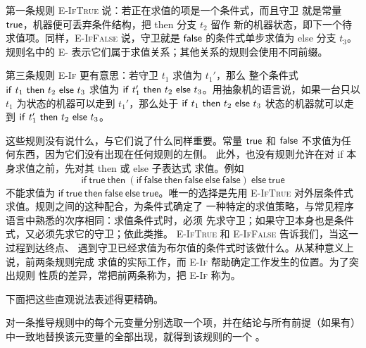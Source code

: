 第一条规则 \textsc{E-IfTrue} 说：若正在求值的项是一个条件式，而且守卫
就是常量 \(\mathsf{true}\)，机器便可丢弃条件结构，把 then 分支 \(t_2\) 留作
新的机器状态，即下一个待求值项。同样，\textsc{E-IfFalse} 说，守卫就是
\(\mathsf{false}\) 的条件式单步求值为 else 分支 \(t_3\)。规则名中的
\textsc{E-} 表示它们属于求值关系；其他关系的规则会使用不同前缀。

第三条规则 \textsc{E-If} 更有意思：若守卫 \(t_1\) 求值为 \(t_1'\)，那么
整个条件式 \(\mathsf{if}\ t_1\ \mathsf{then}\ t_2\ \mathsf{else}\ t_3\) 求值为
\(\mathsf{if}\ t_1'\ \mathsf{then}\ t_2\ \mathsf{else}\ t_3\)。用抽象机的语言说，如果一台只以 \(t_1\)
为状态的机器可以走到 \(t_1'\)，那么处于
\(\mathsf{if}\ t_1\ \mathsf{then}\ t_2\ \mathsf{else}\ t_3\) 状态的机器就可以走到
\(\mathsf{if}\ t_1'\ \mathsf{then}\ t_2\ \mathsf{else}\ t_3\)。

这些规则没有说什么，与它们说了什么同样重要。常量 \(\mathsf{true}\) 和
\(\mathsf{false}\) 不求值为任何东西，因为它们没有出现在任何规则的左侧。
此外，也没有规则允许在对 if 本身求值之前，先对其 then 或 else 子表达式
求值。例如
\[
 \mathsf{if\ true\ then\ (if\ false\ then\ false\ else\ false)\
 else\ true}
\]
不能求值为
\(\mathsf{if\ true\ then\ false\ else\ true}\)。唯一的选择是先用
\textsc{E-IfTrue} 对外层条件式求值。规则之间的这种配合，为条件式确定了
一种特定的求值策略，与常见程序语言中熟悉的次序相同：求值条件式时，必须
先求守卫；如果守卫本身也是条件式，又必须先求它的守卫；依此类推。
\textsc{E-IfTrue} 和 \textsc{E-IfFalse} 告诉我们，当这一过程到达终点、
遇到守卫已经求值为布尔值的条件式时该做什么。从某种意义上说，前两条规则完成
求值的实际工作，而 \textsc{E-If} 帮助确定工作发生的位置。为了突出规则
性质的差异，常把前两条称为，把
\textsc{E-If} 称为。


下面把这些直观说法表述得更精确。

\begin{definition}
\label{def:3.5.1}
对一条推导规则中的每个元变量分别选取一个项，并在结论与所有前提（如果有）
中一致地替换该元变量的全部出现，就得到该规则的一个
。
\end{definition}

